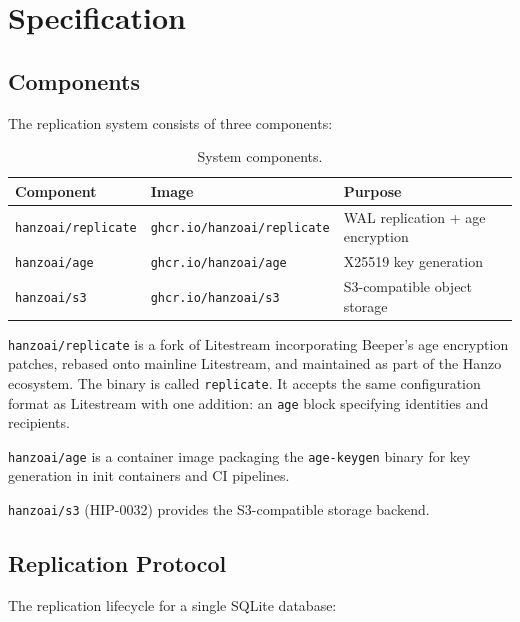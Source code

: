\section{Specification}


\subsection{Components}

The replication system consists of three components:

\begin{table}[H]
\centering
\begin{tabular}{@{}lll@{}}
\toprule
\textbf{Component} & \textbf{Image} & \textbf{Purpose} \\
\midrule
\texttt{hanzoai/replicate} & \texttt{ghcr.io/hanzoai/replicate} & WAL replication + age encryption \\
\texttt{hanzoai/age}       & \texttt{ghcr.io/hanzoai/age}       & X25519 key generation \\
\texttt{hanzoai/s3}        & \texttt{ghcr.io/hanzoai/s3}        & S3-compatible object storage \\
\bottomrule
\end{tabular}
\caption{System components.}
\label{tab:components}
\end{table}

\texttt{hanzoai/replicate} is a fork of Litestream incorporating Beeper's
age encryption patches, rebased onto mainline Litestream, and maintained as
part of the Hanzo ecosystem. The binary is called \texttt{replicate}. It
accepts the same configuration format as Litestream with one addition: an
\texttt{age} block specifying identities and recipients.

\texttt{hanzoai/age} is a container image packaging the \texttt{age-keygen}
binary for key generation in init containers and CI pipelines.

\texttt{hanzoai/s3} (HIP-0032) provides the S3-compatible storage backend.

\subsection{Replication Protocol}

The replication lifecycle for a single SQLite database:

